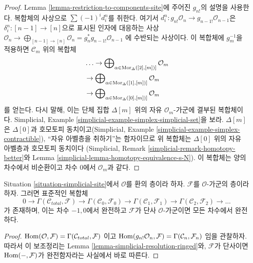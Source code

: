 \begin{proof}
Lemma \ref{lemma-restriction-to-components-site}에 주어진
$g_{n!}$의 설명을 사용한다. 복합체의 사상으로
$\sum (-1)^i d^n_i$를 취한다. 여기서
$d^n_i : g_{n!}\mathcal{O}_n \to g_{n - 1!}\mathcal{O}_{n - 1}$은
$\delta^n_i : [n - 1] \to [n]$으로 표시된 인자에 대응하는 사상
$\mathcal{O}_n \to \bigoplus_{[n - 1] \to [n]} \mathcal{O}_n =
g_n^*g_{n - 1!}\mathcal{O}_{n - 1}$
에 수반되는 사상이다. 이 복합체에 $g_m^{-1}$을 적용하면
$\mathcal{C}_m$ 위의 복합체
$$
\begin{aligned}
&\ldots \to
\bigoplus\nolimits_{\alpha \in \mathop{\mathrm{Mor}}\nolimits_\Delta([2], [m])]} \mathcal{O}_m
\\
&\to
\bigoplus\nolimits_{\alpha \in \mathop{\mathrm{Mor}}\nolimits_\Delta([1], [m])]} \mathcal{O}_m
\\
&\to
\bigoplus\nolimits_{\alpha \in \mathop{\mathrm{Mor}}\nolimits_\Delta([0], [m])]} \mathcal{O}_m
\end{aligned}
$$
를 얻는다. 다시 말해, 이는 단체 집합 $\Delta[m]$ 위의 자유
$\mathcal{O}_m$-가군에 결부된 복합체이다. Simplicial, Example
\ref{simplicial-example-simplex-simplicial-set}을 보라.
$\Delta[m]$은 $\Delta[0]$과 호모토피 동치이고(Simplicial, Example
\ref{simplicial-example-simplex-contractible}),
“자유 아벨층을 취하기”는 함자이므로 위 복합체는
$\Delta[0]$ 위의 자유 아벨층과 호모토피 동치이다
(Simplicial, Remark \ref{simplicial-remark-homotopy-better}와
Lemma \ref{simplicial-lemma-homotopy-equivalence-s-N}).
이 복합체는 양의 차수에서 비순환이고 차수 $0$에서
$\mathcal{O}_m$과 같다.
\end{proof}

\begin{lemma}
\label{lemma-cech-complex-modules}
Situation \ref{situation-simplicial-site}에서 $\mathcal{O}$를 환의 층이라 하자.
$\mathcal{F}$를 $\mathcal{O}$-가군의 층이라 하자. 그러면 표준적인 복합체
$$
0 \to \Gamma(\mathcal{C}_{total}, \mathcal{F}) \to
\Gamma(\mathcal{C}_0, \mathcal{F}_0) \to
\Gamma(\mathcal{C}_1, \mathcal{F}_1) \to
\Gamma(\mathcal{C}_2, \mathcal{F}_2) \to \ldots
$$
가 존재하며, 이는 차수 $-1, 0$에서 완전하고
$\mathcal{F}$가 단사 $\mathcal{O}$-가군이면 모든 차수에서 완전하다.
\end{lemma}

\begin{proof}
$\mathop{\mathrm{Hom}}\nolimits(\mathcal{O}, \mathcal{F}) = \Gamma(\mathcal{C}_{total}, \mathcal{F})$
이고
$\mathop{\mathrm{Hom}}\nolimits(g_{n!}\mathcal{O}_n, \mathcal{F}) = \Gamma(\mathcal{C}_n, \mathcal{F}_n)$
임을 관찰하자. 따라서 이 보조정리는
Lemma \ref{lemma-simplicial-resolution-ringed}와,
$\mathcal{F}$가 단사이면 $\mathop{\mathrm{Hom}}\nolimits(-, \mathcal{F})$가 완전함자라는
사실에서 바로 따른다.
\end{proof}

